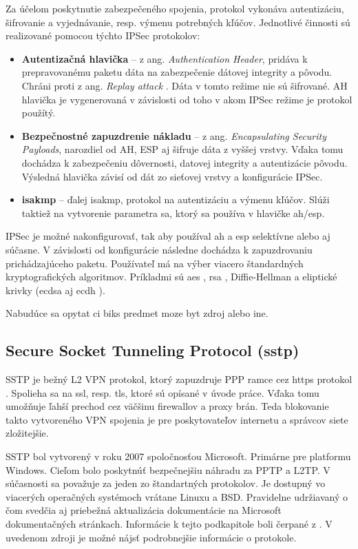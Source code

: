 Za účelom poskytnutie zabezpečeného spojenia, protokol vykonáva autentizáciu, šifrovanie a vyjednávanie, resp. výmenu potrebných kľúčov. Jednotlivé činnosti sú realizované pomocou týchto IPSec protokolov:
\begin{itemize}
	\item{\textbf{Autentizačná hlavička}} -- z ang. \textit{Authentication Header}, pridáva k prepravovanému paketu dáta na zabezpečenie dátovej integrity a pôvodu. Chráni proti z ang. \textit{Replay attack} \cite{repa}. Dáta v tomto režime nie sú šifrované. AH hlavička je vygenerovaná v závislosti od toho v akom IPSec režime je protokol použítý.    
	\item{\textbf{Bezpečnostné zapuzdrenie nákladu}} -- z ang. \textit{Encapsulating Security Payloads}, narozdiel od AH, ESP aj šifruje dáta z vyššej vrstvy. Vďaka tomu dochádza k zabezpečeniu dôvernosti, datovej integrity a autentizácie pôvodu. Výsledná hlavička závisí od dát zo sieťovej vrstvy a konfigurácie IPSec.    
	\item{\textbf{\acrlong{isakmp}}} -- ďalej \acrshort{isakmp}, protokol na autentizáciu a výmenu kľúčov. Slúži taktiež na vytvorenie parametra \acrshort{sa}, ktorý sa používa v hlavičke \acrshort{ah}/\acrshort{esp}.
\end{itemize}

IPSec je možné nakonfigurovať, tak aby používal \acrshort{ah} a \acrshort{esp} selektívne alebo aj súčasne. V závislosti od konfigurácie následne dochádza k zapuzdrovaniu prichádzajúceho paketu. Používateľ má na výber viacero štandardných kryptografických algoritmov. Príkladmi sú \acrshort{aes} \cite{aes}, \acrshort{rsa} \cite{rsa}, Diffie-Hellman \cite{dh} a  eliptické krivky (\acrshort{ecdsa} \cite{ecdsa} aj \acrshort{ecdh} \cite{ecdh}).

Nabudúce sa opytat ci biks predmet moze byt zdroj alebo ine. \cite{biks}

\subsection{Secure Socket Tunneling Protocol (\acrshort{sstp})}
SSTP je bežný L2 VPN protokol, ktorý zapuzdruje PPP ramce cez \acrshort{https} protokol \cite{https}. Spolieha sa na \acrshort{ssl}, resp. \acrshort{tls}, ktoré sú opísané v úvode práce. Vďaka tomu umožňuje ľahší prechod cez väčšinu firewallov a proxy brán. Teda blokovanie takto vytvoreného VPN spojenia je pre poskytovateľov internetu a správcov siete zložitejšie. 

SSTP bol vytvorený v roku 2007 spoločnosťou Microsoft. Primárne pre platformu Windows. Cieľom bolo poskytnúť bezpečnejšiu náhradu za PPTP a L2TP. V súčasnosti sa považuje za jeden zo štandartných protokolov. Je dostupný vo viacerých operačných systémoch vrátane Linuxu a BSD. Pravidelne udržiavaný o čom svedčia aj priebežná aktualizácia dokumentácie na Microsoft dokumentačných stránkach. Informácie k tejto podkapitole boli čerpané z \cite{mssstp}. V uvedenom zdroji je možné nájsť podrobnejšie informácie o protokole. 

